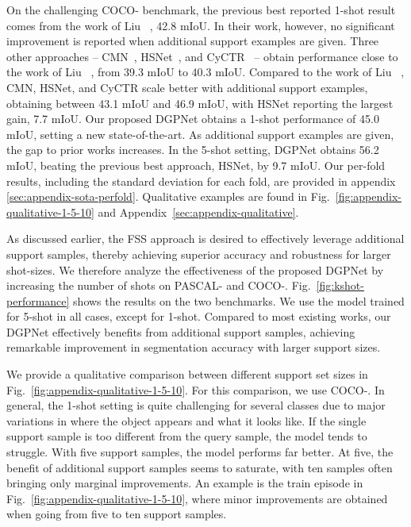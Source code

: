 On the challenging COCO- benchmark, the previous best reported 1-shot result comes from the work of Liu \etal~\cite{Liu2020_DE}, 42.8 mIoU. In their work, however, no significant improvement is reported when additional support examples are given. Three other approaches -- CMN~\cite{xie2021few}, HSNet~\cite{min2021hypercorrelation}, and CyCTR~\cite{zhang2021few} -- obtain performance close to the work of Liu \etal~\cite{Liu2020_DE}, from 39.3 mIoU to 40.3 mIoU. Compared to the work of Liu \etal~\cite{Liu2020_DE}, CMN, HSNet, and CyCTR scale better with additional support examples, obtaining between 43.1 mIoU and 46.9 mIoU, with HSNet reporting the largest gain, 7.7 mIoU. Our proposed DGPNet obtains a 1-shot performance of 45.0 mIoU, setting a new state-of-the-art. As additional support examples are given, the gap to prior works increases. In the 5-shot setting, DGPNet obtains 56.2 mIoU, beating the previous best approach, HSNet, by 9.7 mIoU. Our per-fold results, including the standard deviation for each fold, are provided in appendix \ref{sec:appendix-sota-perfold}. Qualitative examples are found in Fig.~\ref{fig:appendix-qualitative-1-5-10} and Appendix~\ref{sec:appendix-qualitative}.

As discussed earlier, the FSS approach is desired to effectively leverage additional support samples, thereby achieving superior accuracy and robustness for larger shot-sizes. We therefore analyze the effectiveness of the proposed DGPNet by increasing the number of shots on PASCAL- and COCO-. Fig.~\ref{fig:kshot-performance} shows the results on the two benchmarks. We use the model trained for 5-shot in all cases, except for 1-shot. Compared to most existing works, our DGPNet effectively benefits from additional support samples, achieving remarkable improvement in segmentation accuracy with larger support sizes.

We provide a qualitative comparison between different support set sizes in Fig.~\ref{fig:appendix-qualitative-1-5-10}. For this comparison, we use COCO-. In general, the 1-shot setting is quite challenging for several classes due to major variations in where the object appears and what it looks like. If the single support sample is too different from the query sample, the model tends to struggle. With five support samples, the model performs far better. At five, the benefit of additional support samples seems to saturate, with ten samples often bringing only marginal improvements. An example is the train episode in Fig.~\ref{fig:appendix-qualitative-1-5-10}, where minor improvements are obtained when going from five to ten support samples.

